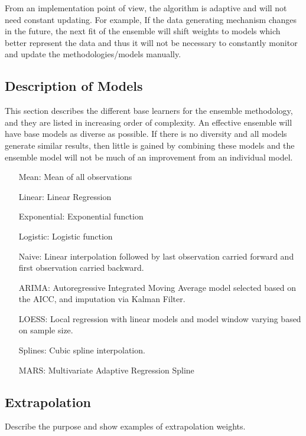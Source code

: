 \documentclass[nojss]{jss}\usepackage[]{graphicx}\usepackage[]{color}
\begin{document}
From an implementation point of view, the algorithm is adaptive and will not need constant updating.  For example, If the data generating mechanism changes in the future, the next fit of the ensemble will shift weights to models which better represent the data and thus it will not be necessary to constantly monitor and update the methodologies/models manually.

\subsection{Description of Models}

This section describes the different base learners for the ensemble methodology, and they are listed in increasing order of complexity. An effective ensemble will have base models as diverse as possible. If there is no diversity and all models generate similar results, then little is gained by combining these models and the ensemble model will not be much of an improvement from an individual model.\\

\begin{itemize}
  \setlength{\leftmargini}{5em}
  \item [Mean:] Mean of all observations
  \item [Linear:] Linear Regression
  \item [Exponential:] Exponential function
  \item [Logistic:] Logistic function        
  \item [Naive:] Linear interpolation followed by last observation
    carried forward and first observation carried backward.
  \item [ARIMA:] Autoregressive Integrated Moving Average model
    selected based on the AICC, and imputation via Kalman Filter.
  \item [LOESS:] Local regression with linear models and model window
    varying based on sample size.
  \item [Splines:] Cubic spline interpolation.
  \item [MARS:] Multivariate Adaptive Regression Spline
\end{itemize}

\subsection{Extrapolation}

Describe the purpose and show examples of extrapolation weights.
\end{document}
